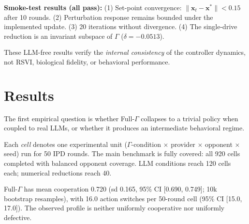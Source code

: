 \documentclass{article}
\begin{document}
\textbf{Smoke-test results (all pass):} (1) Set-point convergence: $\|\mathbf{x}_t - \mathbf{x}^{*}\| < 0.15$ after 10 rounds. (2) Perturbation response remains bounded under the implemented update. (3) 20 iterations without divergence. (4) The single-drive reduction is an invariant subspace of $\Gamma$ ($\delta = -0.0513$).

These LLM-free results verify the \textit{internal consistency} of the controller dynamics, not RSVI, biological fidelity, or behavioral performance.

\section{Results}\label{sec:results}

The first empirical question is whether Full-$\Gamma$ collapses to a trivial policy when coupled to real LLMs, or whether it produces an intermediate behavioral regime.

Each \emph{cell} denotes one experimental unit (\mbox{$\Gamma$-condition} $\times$ provider $\times$ opponent $\times$ seed) run for 50 IPD rounds. The main benchmark is fully covered: all 920 cells completed with balanced opponent coverage. LLM conditions reach 120 cells each; numerical reductions reach 40.

\begin{table}[!h]
\caption{Main 920-cell benchmark. Means with 95\% bootstrap CIs; full summary in Table~\ref{tab:snapshot-full}.}
\label{tab:snapshot}
\centering
\small
{}
\end{table}

Full-$\Gamma$ has mean cooperation 0.720 (sd 0.165, 95\% CI [0.690, 0.749]; 10k bootstrap resamples), with 16.0 action switches per 50-round cell (95\% CI [15.0, 17.0]). The observed profile is neither uniformly cooperative nor uniformly defective.
\end{document}
